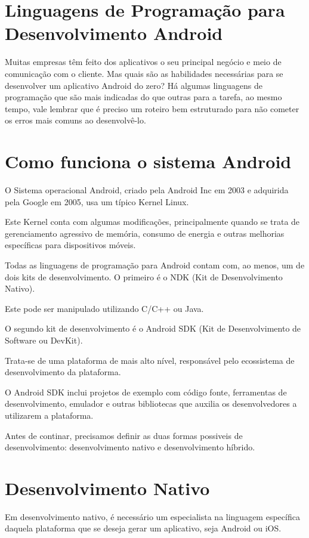 \section{Linguagens de Programação para Desenvolvimento Android}

Muitas empresas têm feito dos aplicativos o seu principal negócio e meio de comunicação com o cliente. Mas quais são as habilidades necessárias para se desenvolver um aplicativo Android do zero? Há algumas linguagens de programação que são mais indicadas do que outras para a tarefa, ao mesmo tempo, vale lembrar que é preciso um roteiro bem estruturado para não cometer os erros mais comuns ao desenvolvê-lo.

\section{Como funciona o sistema Android}

O Sistema operacional Android, criado pela Android Inc em 2003 e adquirida pela Google em 2005, usa um típico Kernel Linux.

Este Kernel conta com algumas modificações, principalmente quando se trata de gerenciamento agressivo de memória, consumo de energia e outras melhorias específicas para dispositivos móveis.

Todas as linguagens de programação para Android contam com, ao menos, um de dois kits de desenvolvimento. O primeiro é o NDK (Kit de Desenvolvimento Nativo).

Este pode ser manipulado utilizando C/C++ ou Java.

O segundo kit de desenvolvimento é o Android SDK (Kit de Desenvolvimento de Software ou DevKit).

Trata-se de uma plataforma de mais alto nível, responsável pelo ecossistema de desenvolvimento da plataforma.

O Android SDK inclui projetos de exemplo com código fonte, ferramentas de desenvolvimento, emulador e outras bibliotecas que auxilia os desenvolvedores a utilizarem a plataforma.

Antes de continar, precisamos definir as duas formas possiveis de desenvolvimento: desenvolvimento nativo e desenvolvimento híbrido.

\section{Desenvolvimento Nativo}

Em desenvolvimento nativo, é necessário um especialista na linguagem específica daquela plataforma que se deseja gerar um aplicativo, seja Android ou iOS.

